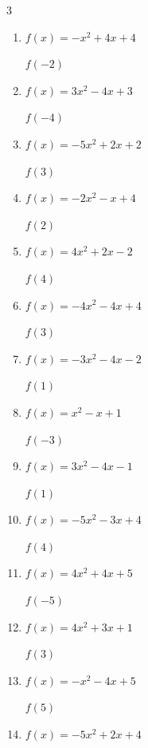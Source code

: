 \begin{multicols}{3}
\begin{enumerate}
$f(4)$
        \phantom{$= 77$}

  \item $f(x)=-x^{2}+4x+4$

$f(-2)$
        \phantom{$= -8$}

  \item $f(x)=3x^{2}-4x+3$

$f(-4)$
        \phantom{$= 67$}

  \item $f(x)=-5x^{2}+2x+2$

$f(3)$
        \phantom{$= -37$}

  \item $f(x)=-2x^{2}-x+4$

$f(2)$
        \phantom{$= -6$}

  \item $f(x)=4x^{2}+2x-2$

$f(4)$
        \phantom{$= 70$}

  \item $f(x)=-4x^{2}-4x+4$

$f(3)$
        \phantom{$= -44$}

  \item $f(x)=-3x^{2}-4x-2$

$f(1)$
        \phantom{$= -9$}

  \item $f(x)=x^{2}-x+1$

$f(-3)$
        \phantom{$= 13$}

  \item $f(x)=3x^{2}-4x-1$

$f(1)$
        \phantom{$= -2$}

  \item $f(x)=-5x^{2}-3x+4$

$f(4)$
        \phantom{$= -88$}

  \item $f(x)=4x^{2}+4x+5$

$f(-5)$
        \phantom{$= 85$}

  \item $f(x)=4x^{2}+3x+1$

$f(3)$
        \phantom{$= 46$}

  \item $f(x)=-x^{2}-4x+5$

$f(5)$
        \phantom{$= -40$}

\columnbreak %

\resetques

  \item $f(x)=-5x^{2}+2x+4$


\end{enumerate}
\end{multicols}
